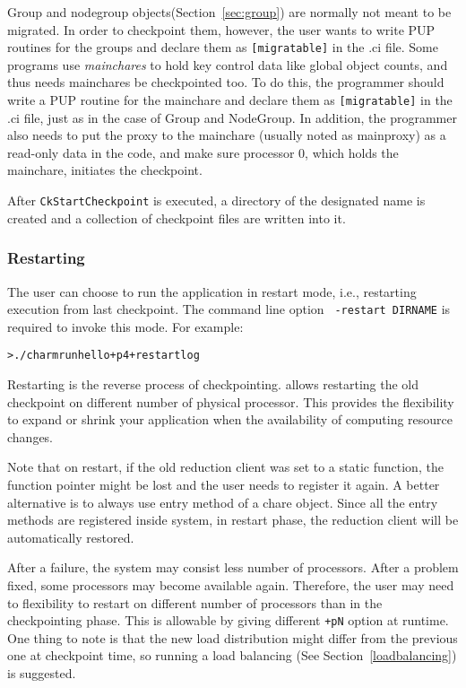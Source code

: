 Group and nodegroup objects(Section~\ref{sec:group}) are normally not 
meant to be migrated. In order to checkpoint them, however, the user 
wants to write PUP routines for the groups and declare them as 
{\tt [migratable]} in the .ci file. Some programs use {\it mainchares}
to hold key control data like global object counts, and thus needs
mainchares be checkpointed too. To do this, the programmer should write
a PUP routine for the mainchare and declare them as {\tt [migratable]} 
in the .ci file, just as in the case of Group and NodeGroup. In addition,
the programmer also needs to put the proxy to the mainchare (usually 
noted as mainproxy) as a read-only data in the code, and make sure 
processor 0, which holds the mainchare, initiates the checkpoint.

After {\tt CkStartCheckpoint} is executed, a directory of the designated
name is created and a collection of checkpoint files are written into it. 

\subsubsection{Restarting}

The user can choose to run the \charmpp{} application in restart mode, i.e.,
restarting execution from last checkpoint. The command line option {\tt
-restart DIRNAME} is required to invoke this mode. For example:

\begin{alltt}
  > ./charmrun hello +p4 +restart log
\end{alltt}

Restarting is the reverse process of checkpointing. \charmpp{} allows 
restarting the old checkpoint on different number of physical processor.
This provides the flexibility to expand or shrink your application when
the availability of computing resource changes. 

Note that on restart, if the old reduction client was set to a static 
function, the function pointer might be lost and the user needs to register
it again. A better alternative is to always use entry method of a chare
object. Since all the entry methods are registered inside \charmpp{} system,
in restart phase, the reduction client will be automatically restored.

After a failure, the system may consist less number of processors. After
a problem fixed, some processors may become available again. Therefore,
the user may need to flexibility to restart on different number of processors
than in the checkpointing phase. This is allowable by giving different 
{\tt +pN} option at runtime. One thing to note is that the new load 
distribution might differ from the previous one at checkpoint time,
so running a load balancing (See Section~\ref{loadbalancing}) is suggested. 

